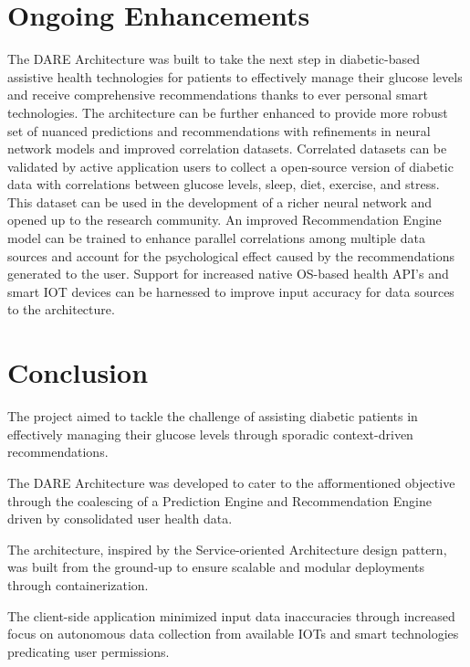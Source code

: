 
\chapter{Ongoing Enhancements}
\label{sec:ongoing_enhancements}
The DARE Architecture was built to take the next step in diabetic-based assistive health technologies for patients to effectively manage their glucose levels and receive comprehensive recommendations thanks to ever personal smart technologies.
The architecture can be further enhanced to provide more robust set of nuanced predictions and recommendations with refinements in neural network models and improved correlation datasets. 
Correlated datasets can be validated by active application users to collect a open-source version of diabetic data with correlations between glucose levels, sleep, diet, exercise, and stress. This dataset can be used in the development of a richer neural network and opened up to the research community.
An improved Recommendation Engine model can be trained to enhance parallel correlations among multiple data sources and account for the psychological effect caused by the recommendations generated to the user.
Support for increased native OS-based health API's and smart IOT devices can be harnessed to improve input accuracy for data sources to the architecture.


\chapter{Conclusion}
\label{sec:conclusion}
The project aimed to tackle the challenge of assisting diabetic patients in effectively managing their glucose levels through sporadic context-driven recommendations.

The DARE Architecture was developed to cater to the afformentioned objective through the coalescing of a Prediction Engine and Recommendation Engine driven by consolidated user health data.

The architecture, inspired by the Service-oriented Architecture design pattern, was built from the ground-up to ensure scalable and modular deployments through containerization. 

The client-side application minimized input data inaccuracies through increased focus on autonomous data collection from available IOTs and smart technologies predicating user permissions. 

